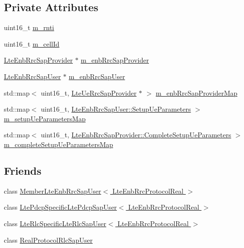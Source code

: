 \subsection*{Private Attributes}
\begin{DoxyCompactItemize}
\item 
uint16\+\_\+t \hyperlink{classns3_1_1LteEnbRrcProtocolReal_ac20f270448ac81e3f80311f575923320}{m\+\_\+rnti}
\item 
uint16\+\_\+t \hyperlink{classns3_1_1LteEnbRrcProtocolReal_aa56625a227ef335a07121a995fce3ceb}{m\+\_\+cell\+Id}
\item 
\hyperlink{classns3_1_1LteEnbRrcSapProvider}{Lte\+Enb\+Rrc\+Sap\+Provider} $\ast$ \hyperlink{classns3_1_1LteEnbRrcProtocolReal_a92e8443c2bba64b254a53d95b495fb39}{m\+\_\+enb\+Rrc\+Sap\+Provider}
\item 
\hyperlink{classns3_1_1LteEnbRrcSapUser}{Lte\+Enb\+Rrc\+Sap\+User} $\ast$ \hyperlink{classns3_1_1LteEnbRrcProtocolReal_ac5bae445416141727fca34b8e35ad446}{m\+\_\+enb\+Rrc\+Sap\+User}
\item 
std\+::map$<$ uint16\+\_\+t, \hyperlink{classns3_1_1LteUeRrcSapProvider}{Lte\+Ue\+Rrc\+Sap\+Provider} $\ast$ $>$ \hyperlink{classns3_1_1LteEnbRrcProtocolReal_af4e248099c293306dc96e00865ae9347}{m\+\_\+enb\+Rrc\+Sap\+Provider\+Map}
\item 
std\+::map$<$ uint16\+\_\+t, \hyperlink{structns3_1_1LteEnbRrcSapUser_1_1SetupUeParameters}{Lte\+Enb\+Rrc\+Sap\+User\+::\+Setup\+Ue\+Parameters} $>$ \hyperlink{classns3_1_1LteEnbRrcProtocolReal_ad6da86f1b3a0f7adf856b4141d587c46}{m\+\_\+setup\+Ue\+Parameters\+Map}
\item 
std\+::map$<$ uint16\+\_\+t, \hyperlink{structns3_1_1LteEnbRrcSapProvider_1_1CompleteSetupUeParameters}{Lte\+Enb\+Rrc\+Sap\+Provider\+::\+Complete\+Setup\+Ue\+Parameters} $>$ \hyperlink{classns3_1_1LteEnbRrcProtocolReal_a17dc0a3ea91240fabb13106efba73176}{m\+\_\+complete\+Setup\+Ue\+Parameters\+Map}
\end{DoxyCompactItemize}
\subsection*{Friends}
\begin{DoxyCompactItemize}
\item 
class \hyperlink{classns3_1_1LteEnbRrcProtocolReal_aa04777d1a23c0bb7fb633992ffab408a}{Member\+Lte\+Enb\+Rrc\+Sap\+User$<$ Lte\+Enb\+Rrc\+Protocol\+Real $>$}
\item 
class \hyperlink{classns3_1_1LteEnbRrcProtocolReal_a3ced8cb707b9e7aa573fe674f7beb5d6}{Lte\+Pdcp\+Specific\+Lte\+Pdcp\+Sap\+User$<$ Lte\+Enb\+Rrc\+Protocol\+Real $>$}
\item 
class \hyperlink{classns3_1_1LteEnbRrcProtocolReal_a5b0f578d72770a5080d5ed5f7a69c0de}{Lte\+Rlc\+Specific\+Lte\+Rlc\+Sap\+User$<$ Lte\+Enb\+Rrc\+Protocol\+Real $>$}
\item 
class \hyperlink{classns3_1_1LteEnbRrcProtocolReal_ad32067090770e9969dfb7368b27d0cf7}{Real\+Protocol\+Rlc\+Sap\+User}
\end{DoxyCompactItemize}
